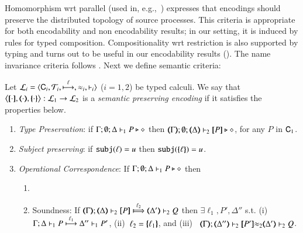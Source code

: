 \smallskip 

\noi Homomorphism wrt parallel (used in, e.g.,~\cite{Palamidessi03,DBLP:conf/lics/PalamidessiSVV06})
expresses that encodings should preserve the distributed topology of source processes. This criteria 
 is appropriate for both encodability and non encodability results; in our setting, it is
induced by rules for typed composition.
Compositionality wrt restriction 
is also supported by typing and turns out to be 
useful in our encodability results ().
The name invariance criteria follows \cite{DBLP:journals/iandc/Gorla10,DBLP:conf/icalp/LanesePSS10}. 
Next we define semantic criteria: %

\smallskip 

\begin{definition}\rm
\label{def:ep}
       Let  $\tyl{L}_i=\calc{\CAL_i}{{\cal{T}}_i}{\hby{\ell}}{\wb_i}{\proves_i}$
       ($i=1,2$) be typed calculi. 
We say that $\enco{\map{\cdot}, \mapt{\cdot}, \mapa{\cdot}}: \tyl{L}_1 \to \tyl{L}_2$ is a \emph{semantic preserving encoding}
if it satisfies the properties below.
	
	\begin{enumerate}[1.]
		\item \emph{Type Preservation}:
	if
	$\Gamma; \emptyset; \Delta \proves_1 P \hastype \Proc$ then 
	$\mapt{\Gamma}; \emptyset; \mapt{\Delta} \proves_2 \map{P} \hastype \Proc$,  
	for any   $P$ in $\CAL_1$.
			\item \emph{Subject preserving}: if $\subj{\ell} = u$ then $\subj{\mapa{\ell}} =u$.


	\item \emph{Operational Correspondence}: If $\Gamma; \emptyset; \Delta \proves_1 P \hastype \Proc$ then
		\begin{enumerate}
			\item	{}
				
			\item	Soundness:   
				If  $\wtytraarg{\mapt{\Gamma}}{\ell_2}{\mapt{\Delta}}{\map{P}}{\mapt{\Delta'}}{Q}{2}$
				then $\exists \ell_1, P', \Delta''$ s.t.  
				(i)~$\stytraarg{\Gamma}{\ell_1}{\Delta}{P}{\Delta''}{P'}{1}$,
				(ii)~$\ell_2 = \mapa{\ell_1}$, and
				(iii)~
${\mapt{\Gamma}};{\mapt{\Delta''}}\proves_2 {\map{P'}}{\wb_2}
{\mapt{\Delta'}}\proves_2 {Q}$.


\end{enumerate}
\end{enumerate}
\end{definition}
